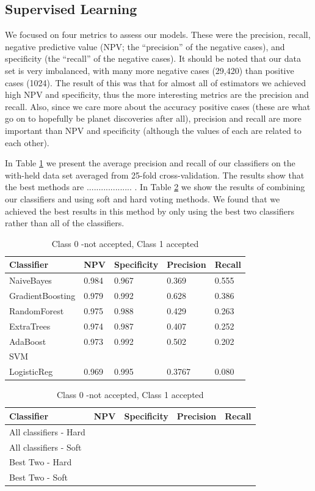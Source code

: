 \subsection{Supervised Learning}

We focused on four metrics to assess our models. These were the precision, recall, negative predictive value (NPV; the ``precision'' of the negative cases), and specificity (the ``recall'' of the negative cases).  It should be noted that our data set is very imbalanced, with many more negative cases (29,420) than positive cases (1024). The result of this was that for almost all of estimators we achieved high NPV and specificity, thus the more interesting metrics are the precision and recall.  Also, since we care more about the accuracy positive cases (these are what go on to hopefully be planet discoveries after all), precision and recall are more important than NPV and specificity (although the values of each are related to each other).

In Table \ref{table:classifiers} we present the average precision and recall of our classifiers on the with-held data set averaged from 25-fold cross-validation. The results show that the best methods are ................... . In Table \ref{table:votingClassifiers} we show the results of combining our classifiers and using soft and hard voting methods. We found that we achieved the best results in this method by only using the best two classifiers rather than all of the classifiers.

\begin{table}
 \begin{tabular}{|l |l |l |l |l |}
\hline
Classifier &NPV & Specificity &Precision & Recall  \\ \hline
 NaiveBayes & 0.984 &  0.967&  0.369 & 0.555 \\ 
GradientBoosting & 0.979 & 0.992 &  0.628 & 0.386\\
RandomForest & 0.975 &  0.988 & 0.429&  0.263 \\
ExtraTrees & 0.974 & 0.987 &  0.407& 0.252 \\
AdaBoost & 0.973&  0.992 & 0.502& 0.202 \\
SVM & & & & \\
LogisticReg &0.969 &  0.995& 0.3767 &  0.080\\\hline
\end{tabular}
\caption{Class 0 -not accepted, Class 1 accepted}
\label{table:classifiers}
\end{table}

\begin{table}
 \begin{tabular}{|l |l |l |l |l |}
\hline
Classifier &NPV &Specificity  &Precision & Recall  \\ \hline
All classifiers - Hard & & & &\\
All classifiers  - Soft & & & &\\ 
Best Two - Hard & & & &\\
Best Two  - Soft & & & &\\ \hline
\end{tabular}
\caption{Class 0 -not accepted, Class 1 accepted}
\label{table:votingClassifiers}
\end{table}